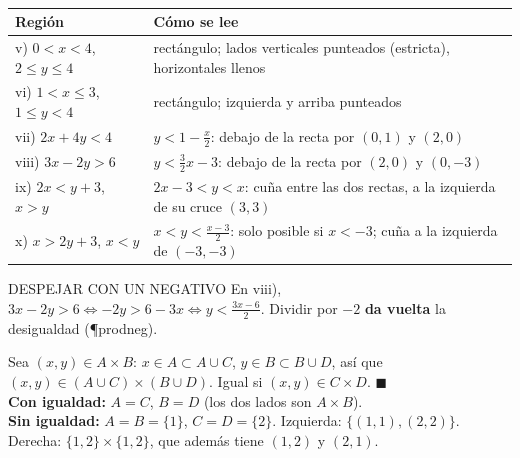 \begin{center}
\hspace{2pt}
\hspace{2pt}
\hspace{2pt}
\hspace{2pt}
\\[3pt]
\hspace{2pt}
\hspace{2pt}
\hspace{2pt}
\hspace{2pt}
\end{center}
\begin{center}\small
\begin{tabularx}{\linewidth}{@{}l X@{}}\toprule
Región & Cómo se lee\\\midrule
v) $0<x<4$, $2\le y\le4$ & rectángulo; lados verticales punteados (estricta), horizontales llenos\\
vi) $1<x\le3$, $1\le y<4$ & rectángulo; izquierda y arriba punteados\\
vii) $2x+4y<4$ & $y<1-\frac x2$: debajo de la recta por $(0,1)$ y $(2,0)$\\
viii) $3x-2y>6$ & $y<\frac32x-3$: debajo de la recta por $(2,0)$ y $(0,-3)$\\
ix) $2x<y+3$, $x>y$ & $2x-3<y<x$: cuña entre las dos rectas, a la izquierda de su cruce $(3,3)$\\
x) $x>2y+3$, $x<y$ & $x<y<\frac{x-3}2$: solo posible si $x<-3$; cuña a la izquierda de $(-3,-3)$\\\bottomrule
\end{tabularx}
\end{center}
\begin{trampa}{DESPEJAR CON UN NEGATIVO}
En viii), $3x-2y>6\iff-2y>6-3x\iff y<\frac{3x-6}{2}$. Dividir por $-2$ \textbf{da vuelta} la desigualdad (\P{prodneg}).
\end{trampa}
Sea $(x,y)\in A\times B$: $x\in A\subset A\cup C$, $y\in B\subset B\cup D$, así que $(x,y)\in(A\cup C)\times(B\cup D)$. Igual si $(x,y)\in C\times D$. $\blacksquare$\\
\textbf{Con igualdad:} $A=C$, $B=D$ (los dos lados son $A\times B$).\\
\textbf{Sin igualdad:} $A=B=\{1\}$, $C=D=\{2\}$. Izquierda: $\{(1,1),(2,2)\}$. Derecha: $\{1,2\}\times\{1,2\}$, que además tiene $(1,2)$ y $(2,1)$.

